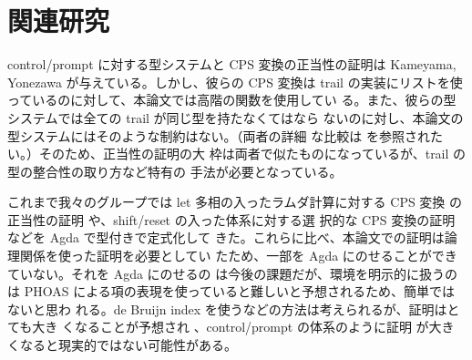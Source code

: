 \section{関連研究}
control/prompt に対する型システムと CPS 変換の正当性の証明は Kameyama,
Yonezawa \cite{KY2008} が与えている。しかし、彼らの CPS 変換は trail
の実装にリストを使っているのに対して、本論文では高階の関数を使用してい
る。また、彼らの型システムでは全ての trail が同じ型を持たなくてはなら
ないのに対し、本論文の型システムにはそのような制約はない。（両者の詳細
な比較は \cite{FSCD2021} を参照されたい。）そのため、正当性の証明の大
枠は両者で似たものになっているが、trail の型の整合性の取り方など特有の
手法が必要となっている。

これまで我々のグループでは let 多相の入ったラムダ計算に対する CPS 変換
の正当性の証明 \cite{CHAM2018} や、shift/reset の入った体系に対する選
択的な CPS 変換の証明 \cite{CHAM2020} などを Agda で型付きで定式化して
きた。これらに比べ、本論文での証明は論理関係を使った証明を必要としてい
たため、一部を Agda にのせることができていない。それを Agda にのせるの
は今後の課題だが、環境を明示的に扱うのは PHOAS \cite{chlipala-phoas}
による項の表現を使っていると難しいと予想されるため、簡単ではないと思わ
れる。de Bruijn index を使うなどの方法は考えられるが、証明はとても大き
くなることが予想され \cite{YK2003}、control/prompt の体系のように証明
が大きくなると現実的ではない可能性がある。




